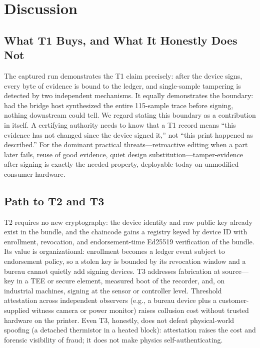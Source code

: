 \section{Discussion}
\label{sec:discussion}

\subsection{What T1 Buys, and What It Honestly Does Not}

The captured run demonstrates the T1 claim precisely: after the device
signs, every byte of evidence is bound to the ledger, and single-sample
tampering is detected by two independent mechanisms.  It equally
demonstrates the boundary: had the bridge host synthesized the entire
115-sample trace before signing, nothing downstream could tell.  We regard
stating this boundary as a contribution in itself.  A certifying authority
needs to know that a T1 record means ``this evidence has not changed since
the device signed it,'' not ``this print happened as described.''  For the
dominant practical threats---retroactive editing when a part later fails,
reuse of good evidence, quiet design substitution---tamper-evidence after
signing is exactly the needed property, deployable today on unmodified
consumer hardware.

\subsection{Path to T2 and T3}

T2 requires no new cryptography: the device identity and raw public key
already exist in the bundle, and the chaincode gains a registry keyed by
device ID with enrollment, revocation, and endorsement-time Ed25519
verification of the bundle.  Its value is organizational: enrollment
becomes a ledger event subject to endorsement policy, so a stolen key is
bounded by its revocation window and a bureau cannot quietly add signing
devices.  T3 addresses fabrication at source---key in a TEE or secure
element, measured boot of the recorder, and, on industrial machines,
signing at the sensor or controller level.  Threshold attestation across
independent observers (e.g., a bureau device plus a customer-supplied
witness camera or power monitor) raises collusion cost without trusted
hardware on the printer.  Even T3, honestly, does not defeat
physical-world spoofing (a detached thermistor in a heated block):
attestation raises the cost and forensic visibility of fraud; it does not
make physics self-authenticating.


